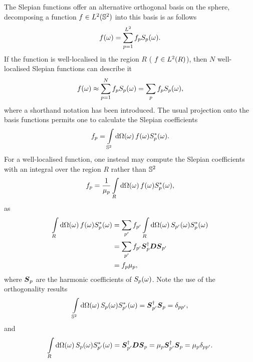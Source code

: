 The Slepian functions offer an alternative orthogonal basis on the sphere, decomposing a function \(f \in \hilbert{\twoSphere}\) into this basis is as follows
%
\begin{equation}
	\pixel{f}
	= \sum\limits_{p=1}^{L^{2}} \slepian{f}\pixel{\slepian{S}}.
\end{equation}
%
If the function is well-localised in the region \(R\) (\ie{} \(f \in \hilbert{R}\)), then \(N\) well-localised Slepian functions can describe it
%
\begin{equation}\label{eq:chapter4_slepian_inverse}
	\pixel{f}
	\approx \sum\limits_{p=1}^{N} \slepian{f}\pixel{\slepian{S}} \\
	= \slepianSum \slepian{f}\pixel{\slepian{S}},
\end{equation}
%
where a shorthand notation has been introduced.
The usual projection onto the basis functions permits one to calculate the Slepian coefficients
%
\begin{equation}
	\slepian{f}
	= \integrateSphere{\omega} \pixel{f} \pixel{\conj{\slepian{S}}}.
\end{equation}
%
For a well-localised function, one instead may compute the Slepian coefficients with an integral over the region \(R\) rather than \(\twoSphere{}\)
%
\begin{equation}
	\slepian{f}
	= \frac{1}{\slepian{\mu}} \integrateRegion{\sphereVolume} \pixel{f} \pixel{\conj{\slepian{S}}},
\end{equation}
%
as
%
\begin{align}\label{eq:chapter4_integrate_region_proof}
	\integrateRegion{\sphereVolume} \pixel{f} \pixel{\conj{\slepian{S}}}
	 & = \slepianSum['] \slepian[']{f} \integrateRegion{\sphereVolume} \pixel{\slepian[']{S}} \pixel{\conj{\slepian{S}}} \nonumber \\
	 & = \slepianSum['] \slepian[']{f} \hermitian{\slepian{\vb*{S}}} \vb*{D} \slepian[']{\vb*{S}} \nonumber                        \\
	 & = \slepian{f} \slepian{\mu},
\end{align}
%
where \(\slepian{\vb*{S}}\) are the harmonic coefficients of \(\pixel{\slepian{S}}\).
Note the use of the orthogonality results
%
\begin{equation}\label{eq:chapter4_orthogonality_sphere}
	\integrateSphere{\omega} \pixel{\slepian{S}} \pixel{\conj{\slepian[']{S}}}
	= \hermitian{\slepian[']{\vb*{S}}} \slepian{\vb*{S}}
	= \delta_{pp'},
\end{equation}
%
and
%
\begin{equation}
	\integrateRegion{\sphereVolume} \pixel{\slepian{S}} \pixel{\conj{\slepian[']{S}}}
	= \hermitian{\slepian[']{\vb*{S}}} \vb*{D} \slepian{\vb*{S}}
	= \slepian{\mu} \hermitian{\slepian[']{\vb*{S}}} \slepian{\vb*{S}}
	= \slepian{\mu} \delta_{pp'}.
\end{equation}

